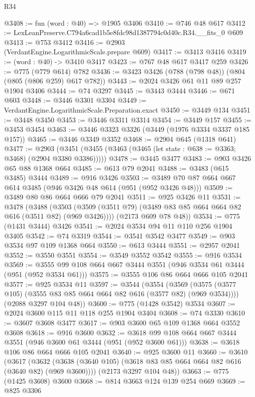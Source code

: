 \begin{lexlean}{R34}
\begin{coremodule}
@3408 := fun (word : @40) => @1905 @3406
@3410 := @746 @48 @617
@3412 := LexLeanPreserve.C794a6cad1b5e8fdc98d1387794c0d40c.R34.__fits_0 @609
@3413 := @753 @3412
@3416 := @2903 (VerdantEngine.LogarithmicScale.prepare @609)
@3417 := @3413 @3416
@3419 := (word : @40) -> @3410 @3417
@3423 := @767 @48 @617 @3417 @259
@3426 := @775 (@779 @614) @782
@3436 := @3423 @3426 (@788 (@798 @48)) (@804 (@805 (@806 @259) @617 @782))
@3443 := @2024 @3426 @61 @11 @89 @257 @1904 @3406
@3444 := @74 @3297
@3445 := @3443 @3444
@3446 := @671 @603
@3448 := @3446 @3301 @3304
@3449 := VerdantEngine.LogarithmicScale.Preparation.exact
@3450 := @3449 @134
@3451 := @3448 @3450
@3453 := @3446 @3311 @3314
@3454 := @3449 @157
@3455 := @3453 @3454
@3463 := @3446 @3323 @3326 (@3449 (@1976 @3334 @3337 @185 @157))
@3465 := @3446 @3349 @3352
@3468 := @2904 @645 (@1318 @641)
@3477 := @2903
    (@3451 (@3455 (@3463 (@3465 (let state : @638 := @3363; @3468) (@2904 @3380 @3386)))))
@3478 := @3445 @3477
@3483 := @903 @3426 @65 @88 @1368 @664
@3485 := @613 @79 @2041
@3488 := @3483 (@615 @3485) @3444
@3489 := @916 @3426
@3503 := @3489 @70 @87 @664 @667 @614 @3485 (@946 @3426 @48 @614 (@951 (@952 @3426 @48)))
@3509 := @3489 @80 @86 @664 @666 @79 @2041
@3511 := @925 @3426 @11
@3531 := @3478
    (@3488
      (@3503 (@3509 (@3511 @79) (@3489 @83 @85 @664 @664 @82 @616 (@3511 @82) (@969 @3426))))
      (@2173 @609 @78 @48))
@3534 := @775 (@1431 @3444) @3426
@3541 := @2024 @3534 @94 @11 @110 @256 @1904 @3405
@3542 := @74 @3319
@3544 := @3541 @3542 @3477
@3549 := @903 @3534 @97 @109 @1368 @664
@3550 := @613 @3444
@3551 := @2957 @2041
@3552 := @3550 @3551
@3554 := @3549 @3552 @3542
@3555 := @916 @3534
@3569 := @3555 @99 @108 @664 @667 @3444 @3551 (@946 @3534 @61 @3444 (@951 (@952 @3534 @61)))
@3575 := @3555 @106 @86 @664 @666 @105 @2041
@3577 := @925 @3534 @11
@3597 := @3544
    (@3554
      (@3569 (@3575 (@3577 @105) (@3555 @83 @85 @664 @664 @82 @616 (@3577 @82) (@969 @3534))))
      (@2088 @3297 @104 @48))
@3600 := @775 (@1428 @3542) @3534
@3607 := @2024 @3600 @115 @11 @118 @255 @1904 @3404
@3608 := @74 @3330
@3610 := @3607 @3608 @3477
@3617 := @903 @3600 @65 @109 @1368 @664 @3552 @3608
@3618 := @916 @3600
@3632 := @3618 @99 @108 @664 @667 @3444 @3551 (@946 @3600 @61 @3444 (@951 (@952 @3600 @61)))
@3638 := @3618 @106 @86 @664 @666 @105 @2041
@3640 := @925 @3600 @11
@3660 := @3610
    (@3617
      (@3632 (@3638 (@3640 @105) (@3618 @83 @85 @664 @664 @82 @616 (@3640 @82) (@969 @3600))))
      (@2173 @3297 @104 @48))
@3663 := @775 (@1425 @3608) @3600
@3668 := @814 @3663 @124 @139 @254 @669
@3669 := @825 @3306

\end{coremodule}
\end{lexlean}
